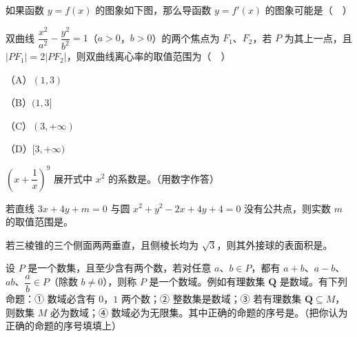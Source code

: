 \begin{question}
如果函数 $y=f(x)$ 的图象如下图，那么导函数 $y=f'(x)$ 的图象可能是（　）
\nopagebreak[4]
\begin{center}\end{center}
\nopagebreak[4]
\end{question}
\begin{question}
双曲线 $\dfrac{x^2}{a^2}-\dfrac{y^2}{b^2}=1$（$a>0$，$b>0$）的两个焦点为 $F_1$、$F_2$，若 $P$ 为其上一点，且 $|PF_1|=2|PF_2|$，则双曲线离心率的取值范围为（　）

（A）$(1,3)$

（B）$(1,3]$

（C）$(3,+\infty)$

（D）$[3,+\infty)$

\end{question}

\begin{question}
$\left(x+\dfrac1x\right)^9$ 展开式中 $x^2$ 的系数是\gkblank{}。（用数字作答）

\end{question}
\begin{question}
若直线 $3x+4y+m=0$ 与圆 $x^2+y^2-2x+4y+4=0$ 没有公共点，则实数 $m$ 的取值范围是\gkblank{}。

\end{question}
\begin{question}
若三棱锥的三个侧面两两垂直，且侧棱长均为 $\sqrt3$，则其外接球的表面积是\gkblank{}。

\end{question}
\begin{question}
设 $P$ 是一个数集，且至少含有两个数，若对任意 $a$、$b\in P$，都有 $a+b$、$a-b$、$ab$、$\dfrac ab\in P$（除数 $b\neq0$），则称 $P$ 是一个数域。例如有理数集 $\mathbf Q$ 是数域。有下列命题：① 数域必含有 $0$，$1$ 两个数；② 整数集是数域；③ 若有理数集 $\mathbf Q\subseteq M$，则数集 $M$ 必为数域；④ 数域必为无限集。其中正确的命题的序号是\gkblank{}。（把你认为正确的命题的序号填填上）

\end{question}

